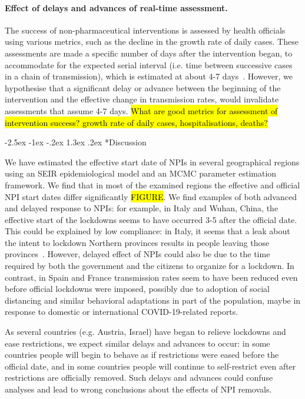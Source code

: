 \documentclass[12pt]{extarticle}
\makeatletter
\renewcommand\section{\@startsection {section}{1}{\z@}%
     {-2.5ex \@plus -1ex \@minus -.2ex}%
     {1.3ex \@plus.2ex}%
    {\Large\bfseries}}
\makeatother
\begin{document}
\paragraph*{Effect of delays and advances of real-time assessment.}

The success of non-pharmaceutical interventions is assessed by health officials using various metrics, such as the decline in the growth rate of daily cases. These assessments are made a specific number of days after the intervention began, to accommodate for the expected serial interval (i.e. time between successive cases in a chain of transmission), which is estimated at about 4-7 days~\citep[Table~1]{Gatto2020}.
However, we hypothesise that a significant delay or advance between the beginning of the intervention and the effective change in transmission rates, would invalidate assessments that assume 4-7 days.
\hl{What are good metrics for assessment of intervention success? growth rate of daily cases, hospitalisations, deaths?}


\pagebreak
\section*{Discussion}

We have estimated the effective start date of NPIs in several geographical regions using an SEIR epidemiological model and an MCMC parameter estimation framework.
We find that in most of the examined regions the effective and official NPI start dates differ significantly \hl{FIGURE}.
We find examples of both advanced and delayed response to NPIs: for example, in Italy and Wuhan, China, the effective start of the lockdowns seems to have occurred 3-5 after the official date. This could be explained by low compliance: in Italy, it seems that a leak about the intent to lockdown Northern provinces results in people leaving those provinces~\citep{Gatto2020}. However, delayed effect of NPIs could also be due to the time required by both the government and the citizens to organize for a lockdown. 
In contrast, in Spain and France transmission rates seem to have been reduced even before official lockdowns were imposed, possibly due to adoption of social distancing and similar behavioral adaptations in part of the population, maybe in response to domestic or international COVID-19-related reports.

As several countries (e.g. Austria, Israel) have began to relieve lockdowns and ease restrictions, we expect similar delays and advances to occur: in some countries people will begin to behave as if restrictions were eased before the official date, and in some countries people will continue to self-restrict even after restrictions are officially removed.
Such delays and advances could confuse analyses and lead to wrong conclusions about the effects of NPI removals.
\end{document}

